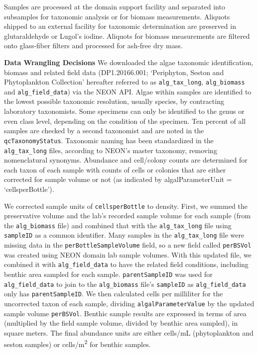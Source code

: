 \documentclass[
  12pt,
]{article}
\begin{document}
Samples are processed at the domain support facility and separated into subsamples for taxonomic analysis or for biomass measurements. Aliquots shipped to an external facility for taxonomic determination are preserved in glutaraldehyde or Lugol's iodine. Aliquots for biomass measurements are filtered onto glass-fiber filters and processed for ash-free dry mass.

\textbf{Data Wrangling Decisions} We downloaded the algae taxonomic identification, biomass and related field data (DP1.20166.001; `Periphyton, Seston and Phytoplankton Collection' hereafter referred to as \texttt{alg\_tax\_long}, \texttt{alg\_biomass} and \texttt{alg\_field\_data}) via the NEON API. Algae within samples are identified to the lowest possible taxonomic resolution, usually species, by contracting laboratory taxonomists. Some specimens can only be identified to the genus or even class level, depending on the condition of the specimen. Ten percent of all samples are checked by a second taxonomist and are noted in the \texttt{qcTaxonomyStatus}. Taxonomic naming has been standardized in the \texttt{alg\_tax\_long} files, according to NEON's master taxonomy, removing nomenclatural synonyms. Abundance and cell/colony counts are determined for each taxon of each sample with counts of cells or colonies that are either corrected for sample volume or not (as indicated by algalParameterUnit = `cellsperBottle').

We corrected sample units of \texttt{cellsperBottle} to density. First, we summed the preservative volume and the lab's recorded sample volume for each sample (from the \texttt{alg\_biomass} file) and combined that with the \texttt{alg\_tax\_long} file using \texttt{sampleID} as a common identifier. Many samples in the \texttt{alg\_tax\_long} file were missing data in the \texttt{perBottleSampleVolume} field, so a new field called \texttt{perBSVol} was created using NEON domain lab sample volumes. With this updated file, we combined it with \texttt{alg\_field\_data} to have the related field conditions, including benthic area sampled for each sample. \texttt{parentSampleID} was used for \texttt{alg\_field\_data} to join to the \texttt{alg\_biomass} file's \texttt{sampleID} as \texttt{alg\_field\_data} only has \texttt{parentSampleID}. We then calculated cells per milliliter for the uncorrected taxon of each sample, dividing \texttt{algalParameterValue} by the updated sample volume \texttt{perBSVol}. Benthic sample results are expressed in terms of area (multiplied by the field sample volume, divided by benthic area sampled), in square meters. The final abundance units are either cells/mL (phytoplankton and seston samples) or cells/m\textsuperscript{2} for benthic samples.
\end{document}
